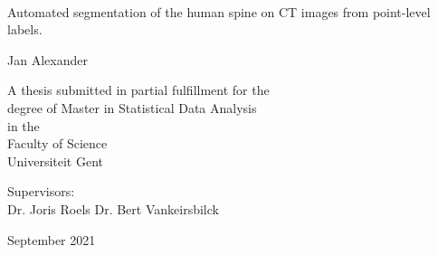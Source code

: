 
%
%
\thispagestyle{empty}

{%
\sffamily
\centering
\Large

~\vspace{\fill}

{\huge 
Automated segmentation of the human spine on CT images from point-level labels.
}

\vspace{2.5cm}

{\LARGE
Jan Alexander
}

\vspace{3.5cm}

A thesis submitted in partial fulfillment for the\\
degree of Master in Statistical Data Analysis\\[1em]
in the\\[1em]
Faculty of Science\\
Universiteit Gent

\vspace{3.5cm}

Supervisors:\\
Dr. Joris Roels
Dr. Bert Vankeirsbilck

\vspace{\fill}

September 2021

}%